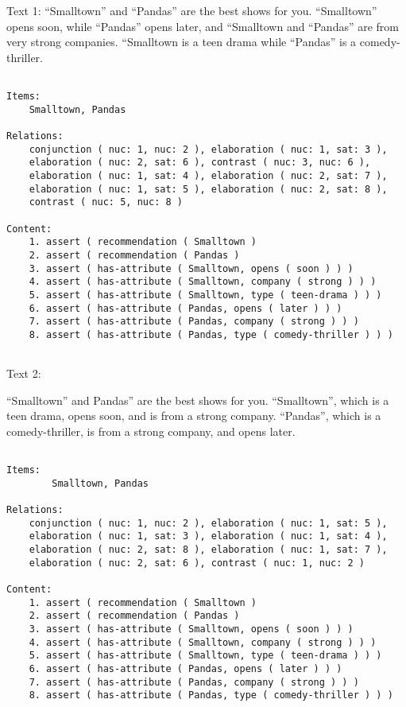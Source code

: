 \documentclass[a4paper,11pt,oneside]{article}
\begin{document}
Text 1:
“Smalltown” and “Pandas” are the best shows for you. “Smalltown” opens soon, while “Pandas” opens later, and “Smalltown and “Pandas” are from very strong companies. “Smalltown is a teen drama while “Pandas” is a comedy-thriller.
\begin{verbatim}

Items:
    Smalltown, Pandas

Relations:
    conjunction ( nuc: 1, nuc: 2 ), elaboration ( nuc: 1, sat: 3 ),
    elaboration ( nuc: 2, sat: 6 ), contrast ( nuc: 3, nuc: 6 ), 
    elaboration ( nuc: 1, sat: 4 ), elaboration ( nuc: 2, sat: 7 ),
    elaboration ( nuc: 1, sat: 5 ), elaboration ( nuc: 2, sat: 8 ), 
    contrast ( nuc: 5, nuc: 8 )
        
Content:
    1. assert ( recommendation ( Smalltown )
    2. assert ( recommendation ( Pandas )
    3. assert ( has-attribute ( Smalltown, opens ( soon ) ) )
    4. assert ( has-attribute ( Smalltown, company ( strong ) ) )
    5. assert ( has-attribute ( Smalltown, type ( teen-drama ) ) )
    6. assert ( has-attribute ( Pandas, opens ( later ) ) )
    7. assert ( has-attribute ( Pandas, company ( strong ) ) )
    8. assert ( has-attribute ( Pandas, type ( comedy-thriller ) ) )
    
\end{verbatim}

Text 2:

“Smalltown” and Pandas” are the best shows for you. “Smalltown”, which is a teen drama, opens soon, and is from a strong company. “Pandas”, which is a comedy-thriller, is from a strong company, and opens later.
\begin{verbatim}

Items:
        Smalltown, Pandas

Relations:
    conjunction ( nuc: 1, nuc: 2 ), elaboration ( nuc: 1, sat: 5 ),
    elaboration ( nuc: 1, sat: 3 ), elaboration ( nuc: 1, sat: 4 ), 
    elaboration ( nuc: 2, sat: 8 ), elaboration ( nuc: 1, sat: 7 ),
    elaboration ( nuc: 2, sat: 6 ), contrast ( nuc: 1, nuc: 2 )
    
Content:
    1. assert ( recommendation ( Smalltown )
    2. assert ( recommendation ( Pandas )
    3. assert ( has-attribute ( Smalltown, opens ( soon ) ) )
    4. assert ( has-attribute ( Smalltown, company ( strong ) ) )
    5. assert ( has-attribute ( Smalltown, type ( teen-drama ) ) )
    6. assert ( has-attribute ( Pandas, opens ( later ) ) )
    7. assert ( has-attribute ( Pandas, company ( strong ) ) )
    8. assert ( has-attribute ( Pandas, type ( comedy-thriller ) ) )

\end{verbatim}
\end{document}
